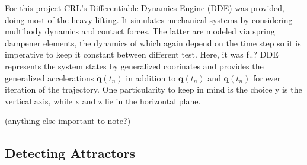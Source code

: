 For this project CRL's Differentiable Dynamics Engine (DDE) was provided, doing most of the heavy lifting. It simulates mechanical systems by considering multibody dynamics and contact forces. The latter are modeled via spring dampener elements, the dynamics of which again depend on the time step so it is imperative to keep it constant between different test. Here, it was f..?
DDE represents the system states by generalized coorinates and provides the generalized accelerations $\ddot{\mathbf{q}}(t_n)$ in addition to $\mathbf{q}(t_n)$ and $\dot{\mathbf{q}}(t_n)$ for ever iteration of the trajectory. One particularity to keep in mind is the choice y is the vertical axis, while x and z lie in the horizontal plane. 

(anything else important to note?)












\subsection{Detecting Attractors}

